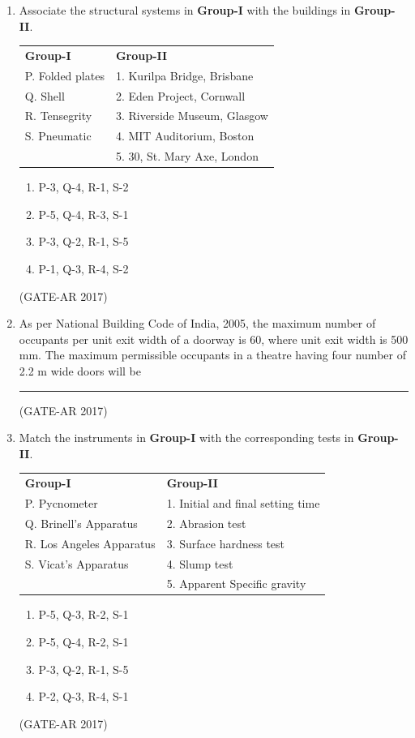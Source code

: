 \documentclass[a4paper,10pt]{article}
\begin{document}
\begin{enumerate}
    \item Associate the structural systems in \textbf{Group-I} with the buildings in \textbf{Group-II}. \\
    \begin{tabular}{ l l }
	\textbf{Group-I} & \textbf{Group-II} \\
	P. Folded plates & 1. Kurilpa Bridge, Brisbane \\
	Q. Shell & 2. Eden Project, Cornwall \\
	R. Tensegrity & 3. Riverside Museum, Glasgow \\
	S. Pneumatic & 4. MIT Auditorium, Boston \\
	& 5. 30, St. Mary Axe, London \\
	\end{tabular}
	\begin{multicols}{2}
	\begin{enumerate}
        \item P-3, Q-4, R-1, S-2
        \item P-5, Q-4, R-3, S-1
        \item P-3, Q-2, R-1, S-5
        \item P-1, Q-3, R-4, S-2
    \end{enumerate}
	\end{multicols}
    \hfill (GATE-AR 2017)

    \item As per National Building Code of India, 2005, the maximum number of occupants per unit exit width of a doorway is 60, where unit exit width is 500 mm. The maximum permissible occupants in a theatre having four number of 2.2 m wide doors will be \rule{2cm}{0.4pt}
    \hfill (GATE-AR 2017)

    \item Match the instruments in \textbf{Group-I} with the corresponding tests in \textbf{Group-II}. \\
    \begin{tabular}{ l l }
	\textbf{Group-I} & \textbf{Group-II} \\
	P. Pycnometer & 1. Initial and final setting time \\
	Q. Brinell's Apparatus & 2. Abrasion test \\
	R. Los Angeles Apparatus & 3. Surface hardness test \\
	S. Vicat's Apparatus & 4. Slump test \\
	& 5. Apparent Specific gravity \\
	\end{tabular}
	\begin{multicols}{2}
	\begin{enumerate}
        \item P-5, Q-3, R-2, S-1
        \item P-5, Q-4, R-2, S-1
        \item P-3, Q-2, R-1, S-5
        \item P-2, Q-3, R-4, S-1
    \end{enumerate}
	\end{multicols}
    \hfill (GATE-AR 2017)


\end{enumerate}
\end{document}
